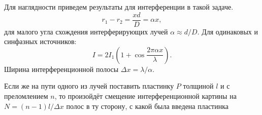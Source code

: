 \begin{minipage}{0.55\textwidth}
    Для наглядности приведем результаты для интерференции в такой задаче.
    \begin{equation*}
    	r_1 - r_2 = \frac{x d}{D} = \alpha x,
    \end{equation*}
    для малого угла схождения интерферирующих лучей $\alpha \approx d/D$. Для одинаковых и синфазных источников:
    \begin{equation*}
    	I = 2 I_1\left(1 + \cos \frac{2 \pi \alpha x}{\lambda}\right).
    \end{equation*}
    Ширина  интерференционной полосы $\Delta x = \lambda / \alpha$.

    Если же на пути одного из лучей поставить пластинку $P$ толщиной $l$ и с преломлением $n$, то произойдёт смещение интерференционной картины на $N = (n-1)l /\Delta x$ полос в ту сторону, с какой была введена пластинка
\end{minipage}
